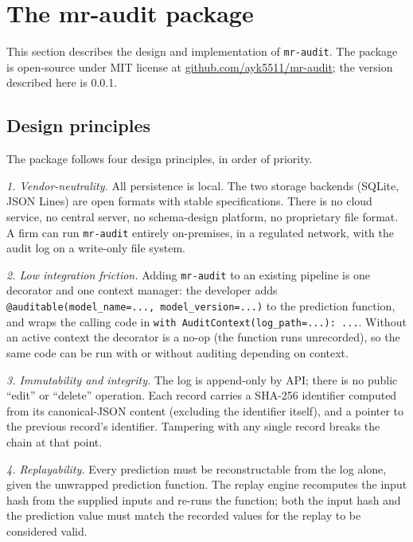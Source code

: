 \section{The mr-audit package}\label{sec:package}

\sloppy

This section describes the design and implementation of \texttt{mr-audit}. The package is open-source under MIT license at \href{https://github.com/ayk5511/mr-audit}{github.com/ayk5511/mr-audit}; the version described here is 0.0.1.

\subsection{Design principles}\label{sec:design_principles}

The package follows four design principles, in order of priority.

\textit{1. Vendor-neutrality.} All persistence is local. The two storage backends (SQLite, JSON Lines) are open formats with stable specifications. There is no cloud service, no central server, no schema-design platform, no proprietary file format. A firm can run \texttt{mr-audit} entirely on-premises, in a regulated network, with the audit log on a write-only file system.

\textit{2. Low integration friction.} Adding \texttt{mr-audit} to an existing pipeline is one decorator and one context manager: the developer adds \verb|@auditable(model_name=..., model_version=...)| to the prediction function, and wraps the calling code in \verb|with AuditContext(log_path=...): ...|. Without an active context the decorator is a no-op (the function runs unrecorded), so the same code can be run with or without auditing depending on context.

\textit{3. Immutability and integrity.} The log is append-only by API; there is no public ``edit'' or ``delete'' operation. Each record carries a SHA-256 identifier computed from its canonical-JSON content (excluding the identifier itself), and a pointer to the previous record's identifier. Tampering with any single record breaks the chain at that point.

\textit{4. Replayability.} Every prediction must be reconstructable from the log alone, given the unwrapped prediction function. The replay engine recomputes the input hash from the supplied inputs and re-runs the function; both the input hash and the prediction value must match the recorded values for the replay to be considered valid.

